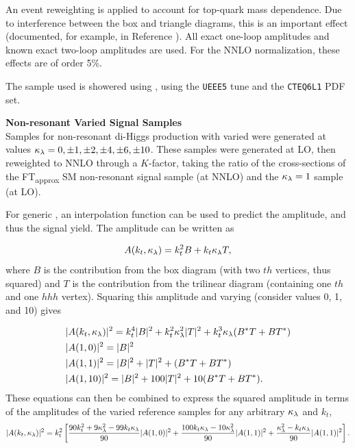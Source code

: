 An event reweighting is applied to account for top-quark mass dependence. Due to interference between the box and triangle diagrams, this is an important effect (documented, for example, in Reference \cite{top-quark-mass-example}). All exact one-loop amplitudes and known exact two-loop amplitudes are used. For the \gls{NNLO} normalization, these effects are of order 5\%.

The sample used is showered using \HERWIGpp \cite{herwigpp}, using the \texttt{UEEE5} tune and the \texttt{CTEQ6L1} PDF set.


\noindent\textbf{Non-resonant Varied \klambda Signal Samples}\\
\indent Samples for non-resonant di-Higgs production with varied \klambda were generated at values $\kappa_{\lambda} = 0, \pm 1, \pm 2, \pm 4, \pm 6, \pm 10$. These samples were generated at \gls{LO}, then reweighted to \gls{NNLO} through a $K$-factor, taking the ratio of the cross-sections of the FT\textsubscript{approx} \gls{SM} non-resonant signal sample (at \gls{NNLO}) and the $\kappa_{\lambda} =1$ sample (at \gls{LO}).

For generic \klambda, an interpolation function can be used to predict the amplitude, and thus the signal yield. The amplitude can be written as

\begin{equation}
  A(k_t,\kappa_{\lambda}) = k_t^2 B + k_t \kappa_{\lambda} T,
\end{equation}
%
where $B$ is the contribution from the box diagram (with two $th$ vertices, thus squared) and $T$ is the contribution from the trilinear diagram (containing one $th$ and one $hhh$ vertex). Squaring this amplitude and varying \klambda (consider values 0, 1, and 10) gives

\begin{align}
  &|A(k_t,\kappa_{\lambda})|^2 = k_t^4 |B|^2 + k_t^2\kappa_{\lambda}^2 |T|^2 + k_t^3\kappa_{\lambda}(B^*T + BT^*)\\
  &|A(1,0)|^2 = |B|^2\\
  &|A(1,1)|^2 = |B|^2 + |T|^2 + (B^*T + BT^*)\\
  &|A(1,10)|^2 = |B|^2 + 100|T|^2 + 10(B^*T + BT^*).
\end{align}
%
These equations can then be combined to express the squared amplitude in terms of the amplitudes of the varied reference samples for any arbitrary $\kappa_{\lambda}$ and $k_t$,
\begin{equation}
  |A(k_t,\kappa_{\lambda})|^2 = k_t^2 \left[ 
    \frac{90 k_t^2 + 9\kappa_{\lambda}^2 - 99k_t\kappa_{\lambda}}{90}|A(1,0)|^2 +
    \frac{100 k_t\kappa_{\lambda} - 10\kappa_{\lambda}^2}{90}|A(1,1)|^2 +
    \frac{\kappa_{\lambda}^2 - k_t\kappa_{\lambda}}{90}|A(1,1)|^2 \right].
\end{equation}

